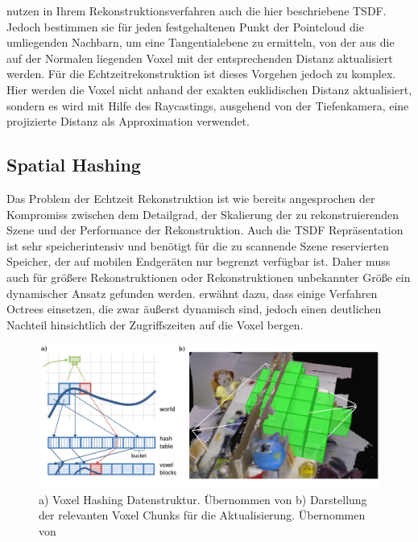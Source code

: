 \citet{hoppe1992surface} nutzen in Ihrem Rekonstruktionsverfahren auch die hier beschriebene TSDF. Jedoch bestimmen sie für jeden festgehaltenen Punkt der Pointcloud die umliegenden Nachbarn, um eine Tangentialebene zu ermitteln, von der aus die auf der Normalen liegenden Voxel mit der entsprechenden Distanz aktualisiert werden. Für die Echtzeitrekonstruktion ist dieses Vorgehen jedoch zu komplex. Hier werden die Voxel nicht anhand der exakten euklidischen Distanz aktualisiert, sondern es wird mit Hilfe des Raycastings, ausgehend von der Tiefenkamera, eine projizierte Distanz als Approximation verwendet. \citep{Compu66:online}

\subsection{Spatial Hashing}

Das Problem der Echtzeit Rekonstruktion ist wie bereits angesprochen der Kompromiss zwischen dem Detailgrad, der Skalierung der zu rekonstruierenden Szene und der Performance der Rekonstruktion. Auch die TSDF Repräsentation ist sehr speicherintensiv und benötigt für die zu scannende Szene reservierten Speicher, der auf mobilen Endgeräten nur begrenzt verfügbar ist. Daher muss auch für größere Rekonstruktionen oder Rekonstruktionen unbekannter Größe ein dynamischer Ansatz gefunden werden. \citet{Klingensmith_2015_7924} erwähnt dazu, dass einige Verfahren Octrees einsetzen, die zwar äußerst dynamisch sind, jedoch einen deutlichen Nachteil hinsichtlich der Zugriffszeiten auf die Voxel bergen. \\

\begin{figure}[h]
  \centering
	\includegraphics[width=1.0\textwidth]{content/images/methods/hashing.png} 
  \caption{a) Voxel Hashing Datenstruktur. Übernommen von \citet{niessner2013real} b) Darstellung der relevanten Voxel Chunks für die Aktualisierung. Übernommen von \citet{Klingensmith_2015_7924}}
  \label{fig:hashing}
\end{figure}

